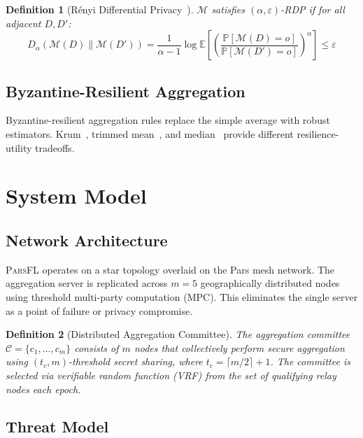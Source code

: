 \documentclass[11pt,a4paper]{article}
\newcommand{\parsfl}{\textsc{ParsFL}\xspace}
\newcommand{\EE}{\mathbb{E}}
\newcommand{\PP}{\mathbb{P}}
\newtheorem{definition}{Definition}
\begin{document}
\begin{definition}[R\'enyi Differential Privacy~\citep{mironov2017renyi}]
$\mathcal{M}$ satisfies $(\alpha, \varepsilon)$-RDP if for all adjacent $D, D'$:
\begin{equation}
    D_\alpha(\mathcal{M}(D) \| \mathcal{M}(D')) = \frac{1}{\alpha - 1} \log \EE\left[\left(\frac{\PP[\mathcal{M}(D) = o]}{\PP[\mathcal{M}(D') = o]}\right)^\alpha\right] \leq \varepsilon
\end{equation}
\end{definition}

\subsection{Byzantine-Resilient Aggregation}

Byzantine-resilient aggregation rules replace the simple average with robust estimators. Krum~\citep{blanchard2017machine}, trimmed mean~\citep{yin2018byzantine}, and median~\citep{yin2018byzantine} provide different resilience-utility tradeoffs.

\section{System Model}

\subsection{Network Architecture}

\parsfl operates on a star topology overlaid on the Pars mesh network. The aggregation server is replicated across $m = 5$ geographically distributed nodes using threshold multi-party computation (MPC). This eliminates the single server as a point of failure or privacy compromise.

\begin{definition}[Distributed Aggregation Committee]
The aggregation committee $\mathcal{C} = \{c_1, \ldots, c_m\}$ consists of $m$ nodes that collectively perform secure aggregation using $(t_c, m)$-threshold secret sharing, where $t_c = \lceil m/2 \rceil + 1$. The committee is selected via verifiable random function (VRF) from the set of qualifying relay nodes each epoch.
\end{definition}

\subsection{Threat Model}
\end{document}
